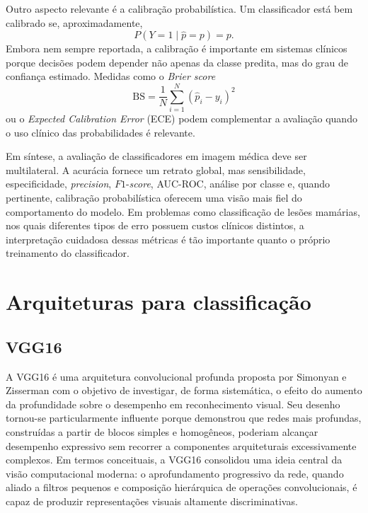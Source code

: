 \documentclass[tcc,capa]{texufpel}
\begin{document}
Outro aspecto relevante é a calibração probabilística. Um classificador está bem calibrado se, aproximadamente,
\begin{equation}
P(Y=1 \mid \hat{p}=p) = p.
\end{equation}
Embora nem sempre reportada, a calibração é importante em sistemas clínicos porque decisões podem depender não apenas da classe predita, mas do grau de confiança estimado. Medidas como o \textit{Brier score}
\begin{equation}
\mathrm{BS} = \frac{1}{N}\sum_{i=1}^{N}(\hat{p}_i - y_i)^2
\end{equation}
ou o \textit{Expected Calibration Error} (ECE) podem complementar a avaliação quando o uso clínico das probabilidades é relevante.

Em síntese, a avaliação de classificadores em imagem médica deve ser multilateral. A acurácia fornece um retrato global, mas sensibilidade, especificidade, \textit{precision}, $F1$-\textit{score}, AUC-ROC, análise por classe e, quando pertinente, calibração probabilística oferecem uma visão mais fiel do comportamento do modelo. Em problemas como classificação de lesões mamárias, nos quais diferentes tipos de erro possuem custos clínicos distintos, a interpretação cuidadosa dessas métricas é tão importante quanto o próprio treinamento do classificador.

\section{Arquiteturas para classificação}

\subsection{VGG16}

A VGG16 é uma arquitetura convolucional profunda proposta por Simonyan e Zisserman com o objetivo de investigar, de forma sistemática, o efeito do aumento da profundidade sobre o desempenho em reconhecimento visual. Seu desenho tornou-se particularmente influente porque demonstrou que redes mais profundas, construídas a partir de blocos simples e homogêneos, poderiam alcançar desempenho expressivo sem recorrer a componentes arquiteturais excessivamente complexos. Em termos conceituais, a VGG16 consolidou uma ideia central da visão computacional moderna: o aprofundamento progressivo da rede, quando aliado a filtros pequenos e composição hierárquica de operações convolucionais, é capaz de produzir representações visuais altamente discriminativas.
\end{document}
